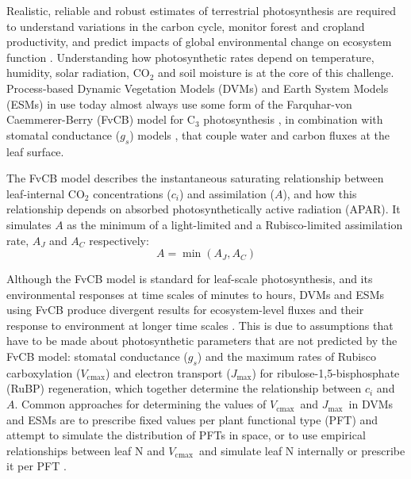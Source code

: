 \documentclass[gmd, manuscript]{copernicus}
\newcommand{\vcmax}{$V_{\text{cmax}}$}
\newcommand{\jmax}{$J_{\text{max}}$}
\begin{document}
Realistic, reliable and robust estimates of terrestrial photosynthesis are required to understand variations in the carbon cycle, monitor forest and cropland productivity, and predict impacts of global environmental change on ecosystem function \citep{prentice15}. Understanding how photosynthetic rates depend on temperature, humidity, solar radiation, CO$_2$ and soil moisture is at the core of this challenge. Process-based Dynamic Vegetation Models (DVMs) and Earth System Models (ESMs) in use today almost always use some form of the Farquhar-von Caemmerer-Berry (FvCB) model for C$_3$ photosynthesis \citep{farquhar80, voncaemmerer81}, in combination with stomatal conductance ($g_s$) models \citep{ball87, leuning95pce, medlyn11gcb}, that couple water and carbon fluxes at the leaf surface. 

The FvCB model describes the instantaneous saturating relationship between leaf-internal CO$_2$ concentrations ($c_i$) and assimilation ($A$), and how this relationship depends on absorbed photosynthetically active radiation (APAR). It simulates $A$ as the minimum of a light-limited and a Rubisco-limited assimilation rate, $A_J$ and $A_C$ respectively:
\begin{equation}
    A = \min(A_J, A_C)
\end{equation}

Although the FvCB model is standard for leaf-scale photosynthesis, and its environmental responses at time scales of minutes to hours, DVMs and ESMs using FvCB produce divergent results for ecosystem-level fluxes and their response to environment at longer time scales \citep{rogers17}. This is due to assumptions that have to be made about photosynthetic parameters that are not predicted by the FvCB model: stomatal conductance ($g_s$) and the maximum rates of Rubisco carboxylation (\vcmax ) and electron transport (\jmax ) for ribulose-1,5-bisphosphate (RuBP) regeneration, which together determine the relationship between $c_i$ and $A$. Common approaches for determining the values of \vcmax\ and \jmax\ in DVMs and ESMs are to prescribe fixed values per plant functional type (PFT) and attempt to simulate the distribution of PFTs in space, or to use empirical relationships between leaf N and \vcmax\ and simulate leaf N internally or prescribe it per PFT \citep{smithdukes13gcb, rogers14}. 
\end{document}
